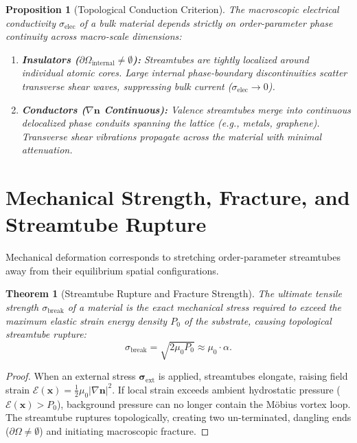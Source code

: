 \documentclass[11pt,a4paper]{article}
\newtheorem{prop}{Proposition}
\newtheorem{thm}{Theorem}
\begin{document}
	\begin{prop}[Topological Conduction Criterion]
		\label{prop:conduction_criterion}
		The macroscopic electrical conductivity $\sigma_{\text{elec}}$ of a bulk material depends strictly on order-parameter phase continuity across macro-scale dimensions:
		\begin{enumerate}
			\item \textbf{Insulators ($\partial \Omega_{\text{internal}} \neq \emptyset$):} Streamtubes are tightly localized around individual atomic cores. Large internal phase-boundary discontinuities scatter transverse shear waves, suppressing bulk current ($\sigma_{\text{elec}} \to 0$).
			\item \textbf{Conductors ($\nabla \mathbf{n}$ Continuous):} Valence streamtubes merge into continuous delocalized phase conduits spanning the lattice (e.g., metals, graphene). Transverse shear vibrations propagate across the material with minimal attenuation.
		\end{enumerate}
	\end{prop}
	
	\section{Mechanical Strength, Fracture, and Streamtube Rupture}
	\label{sec:fracture_mechanics}
	
	Mechanical deformation corresponds to stretching order-parameter streamtubes away from their equilibrium spatial configurations.
	
	\begin{thm}[Streamtube Rupture and Fracture Strength]
		\label{thm:fracture_strength}
		The ultimate tensile strength $\sigma_{\text{break}}$ of a material is the exact mechanical stress required to exceed the maximum elastic strain energy density $P_0$ of the substrate, causing topological streamtube rupture:
		\begin{equation}
			\sigma_{\text{break}} = \sqrt{2 \mu_0 P_0} \approx \mu_0 \cdot \alpha.
			\label{eq:fracture_stress_formula}
		\end{equation}
	\end{thm}
	
	\begin{proof}
		When an external stress $\boldsymbol{\sigma}_{\text{ext}}$ is applied, streamtubes elongate, raising field strain $\mathcal{E}(\mathbf{x}) = \frac{1}{2}\mu_0 |\nabla \mathbf{n}|^2$. If local strain exceeds ambient hydrostatic pressure ($\mathcal{E}(\mathbf{x}) > P_0$), background pressure can no longer contain the Möbius vortex loop. The streamtube ruptures topologically, creating two un-terminated, dangling ends ($\partial \Omega \neq \emptyset$) and initiating macroscopic fracture.
	\end{proof}
	
\end{document}
